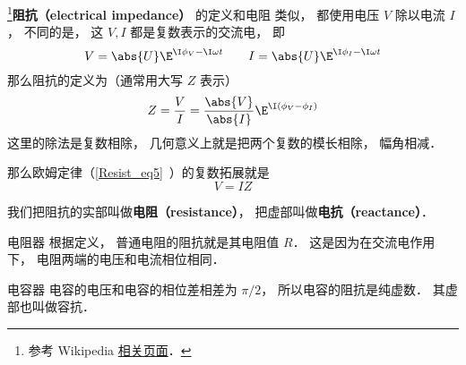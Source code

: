 
\begin{issues}
\issueDraft
\end{issues}


\footnote{参考 Wikipedia \href{https://en.wikipedia.org/wiki/Electrical_impedance}{相关页面}．}\textbf{阻抗（electrical impedance）} 的定义和电阻 类似， 都使用电压 $V$ 除以电流 $I$， 不同的是， 这 $V, I$ 都是复数表示的交流电， 即
\begin{equation}
V = \abs{U} \E^{\I \phi_V - \I \omega t}
\qquad
I = \abs{U} \E^{\I \phi_I - \I \omega t}
\end{equation}
那么阻抗的定义为（通常用大写 $Z$ 表示）
\begin{equation}
Z = \frac{V}{I} = \frac{\abs{V}}{\abs{I}} \E^{\I (\phi_V - \phi_I)}
\end{equation}
这里的除法是复数相除， 几何意义上就是把两个复数的模长相除， 幅角相减．

那么欧姆定律（\autoref{Resist_eq5}~）的复数拓展就是
\begin{equation}
V = IZ
\end{equation}

我们把阻抗的实部叫做\textbf{电阻（resistance）}， 把虚部叫做\textbf{电抗（reactance）}．

\begin{example}{电阻器}\label{impeda_ex1}
根据定义， 普通电阻的阻抗就是其电阻值 $R$． 这是因为在交流电作用下， 电阻两端的电压和电流相位相同．
\end{example}

\begin{example}{电容器}
电容的电压和电容的相位差相差为 $\pi/2$， 所以电容的阻抗是纯虚数． 其虚部也叫做容抗．
\end{example}

